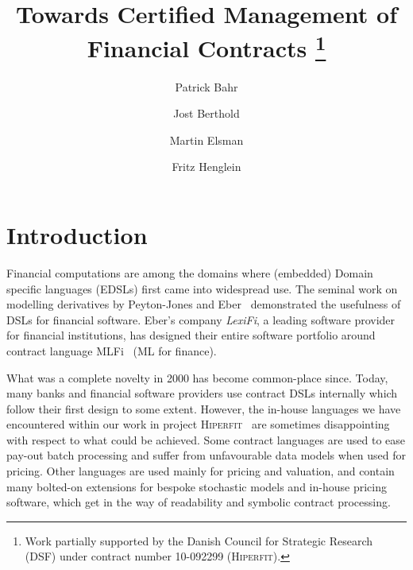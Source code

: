 \documentclass[a4paper,debug,twocolumn]{easychair}
\newcommand{\comm}[3][red]{{\small \color{#1}{$\spadesuit$#2: #3}}}
\newcommand{\jbcomment}[1]{\comm[orange]{jb}{#1}}
\theoremstyle{plain}
\begin{document}
\title{Towards Certified Management of Financial Contracts
\thanks{Work partially supported by the Danish Council for Strategic Research
(DSF) under contract number 10-092299 (\textsc{Hiperfit}).}}


\author{Patrick Bahr
    \and
        Jost Berthold 
    \and 
        Martin Elsman 
    \and 
        Fritz Henglein\\
}



\clearpage
\maketitle

\section{Introduction}

Financial computations are among the domains where (embedded) Domain specific
languages (EDSLs) first came into widespread use.
The seminal work on modelling derivatives by Peyton-Jones and Eber~\cite{SPJ2000}
demonstrated the usefulness of DSLs for financial software.
%
Eber's company \emph{LexiFi}, a leading software provider
for financial institutions, has designed their entire software portfolio
around contract language MLFi~\cite{MLFi} (ML for finance).

What was a complete novelty in 2000 has become common-place since.
Today, many banks and financial software providers use contract DSLs internally
which follow their first design to some extent.
However, the in-house languages we have encountered within our work in project
\textsc{Hiperfit}~\cite{TFP11Hiperfit} are sometimes disappointing with respect
to what could be achieved.
%
Some contract languages are used to ease pay-out batch processing and suffer
from unfavourable data models when used for pricing.
%
Other languages are used mainly for pricing and valuation, and contain many
bolted-on extensions for bespoke stochastic models and in-house pricing
software, which get in the way of readability and symbolic contract processing.
\jbcomment{tone down? how to substantiate it?}
\end{document}
